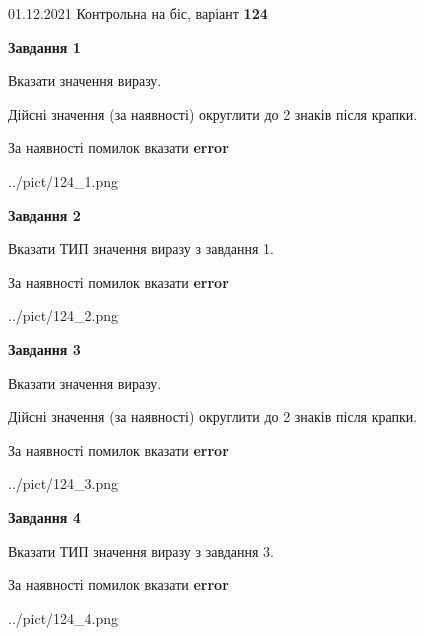 \documentclass[11pt, ukrainian]{article}
\begin{document}
{01.12.2021 Контрольна на біс, варіант  \No \textbf { 124 }\par}
{
\begin {large}
{\begin {center}\textbf{Завдання 1}\end {center}}\par
Вказати значення виразу. \par
Дійсні значення (за наявності) округлити до 2 знаків після крапки. \par
За наявності помилок вказати \textbf{error}

\begin{center}
	{../pict/124_1.png}
\end{center}
\newpage

{\begin {center}\textbf{Завдання 2}\end {center}}\par
Вказати ТИП значення виразу з завдання 1. \par
За наявності помилок вказати \textbf{error}

\begin{center}
	{../pict/124_2.png}
\end{center}
\newpage

{\begin {center}\textbf{Завдання 3}\end {center}}\par
Вказати значення виразу. \par
Дійсні значення (за наявності) округлити до 2 знаків після крапки. \par
За наявності помилок вказати \textbf{error}

\begin{center}
	{../pict/124_3.png}
\end{center}
\newpage

{\begin {center}\textbf{Завдання 4}\end {center}}\par
Вказати ТИП значення виразу з завдання 3. \par
За наявності помилок вказати \textbf{error}

\begin{center}
	{../pict/124_4.png}
\end{center}
\newpage


\end{large}}
\end{document}
